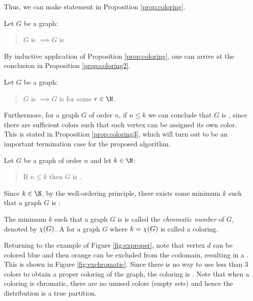 Thus, we can make statement in Proposition \ref{prop:coloring}.

\begin{proposition}
  \label{prop:coloring}
  Let \(G\) be a graph:
  \begin{quote}
    \(G\) is  \(\implies G\) is 
  \end{quote}
\end{proposition}

By inductive application of Proposition \ref{prop:coloring}, one can arrive at the conclusion in Proposition
\ref{prop:coloring2}.

\begin{proposition}
  \label{prop:coloring2}
  Let \(G\) be a graph:
  \begin{quote}
    \(G\) is  \(\implies G\) is  for some \(r\in\N\).
  \end{quote}
\end{proposition}

Furthermore, for a graph \(G\) of order \(n\), if \(n\le k\) we can conclude that \(G\) is , since
there are sufficient colors such that each vertex can be assigned its own color.  This is stated in Proposition
\ref{prop:coloring3}, which will turn out to be an important termination case for the proposed algorithm.

\begin{proposition}
  \label{prop:coloring3}
  Let \(G\) be a graph of order \(n\) and let \(k\in\N\):
  \begin{quote}
    If \(n\le k\) then \(G\) is .
  \end{quote}
\end{proposition}

Since \(k\in\N\), by the well-ordering principle, there exists some minimum \(k\) such that a graph \(G\) is
:

\begin{definition}
  The minimum \(k\) such that a graph \(G\) is  is called the \emph{chromatic number} of \(G\), denoted
  by \(\chi(G)\).  A  for a graph \(G\) where \(k=\chi(G)\) is called a \emph{} coloring.
\end{definition}

Returning to the example  of Figure \ref{fig:exproper}, note that vertex \(d\) can be colored blue and
then orange can be excluded from the codomain, resulting in a .  This is shown in Figure
\ref{fig:exchromatic}.  Since there is no way to use less than 3 colors to obtain a proper coloring of the graph,
the coloring is .  Note that when a coloring is chromatic, there are no unused colors (empty sets) and
hence the distribution is a true partition.

